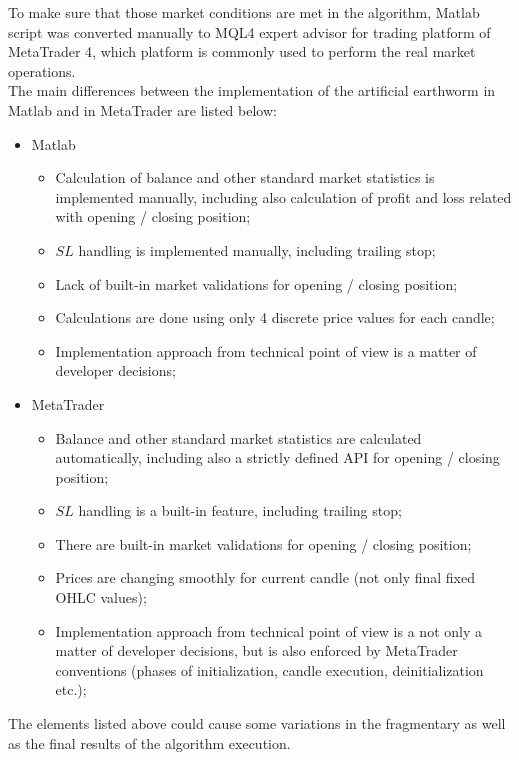\documentclass[runningheads,a4paper]{llncs}
\begin{document}
To make sure that those market conditions are met in the algorithm, Matlab script was converted manually to MQL4 expert advisor for trading platform of MetaTrader 4, which platform is commonly used to perform the real market operations.\\

The main differences between the implementation of the artificial earthworm in Matlab and in MetaTrader are listed below:
\begin{itemize}
\item Matlab
\begin{itemize}
\item Calculation of balance and other standard market statistics is implemented manually, including also calculation of profit and loss related with opening / closing position;
\item $SL$ handling is implemented manually, including trailing stop;
\item Lack of built-in market validations for opening / closing position;
\item Calculations are done using only 4 discrete price values for each candle;
\item Implementation approach from technical point of view is a matter of developer decisions;
\end{itemize}
\item MetaTrader
\begin{itemize}
\item Balance and other standard market statistics are calculated automatically, including also a strictly defined API for opening / closing position;
\item $SL$ handling is a built-in feature, including trailing stop;
\item There are built-in market validations for opening / closing position;
\item Prices are changing smoothly for current candle (not only final fixed OHLC values);
\item Implementation approach from technical point of view is a not only a matter of developer decisions, but is also enforced by MetaTrader conventions (phases of initialization, candle execution, deinitialization etc.);
\end{itemize}
\end{itemize}

The elements listed above could cause some variations in the fragmentary as well as the final results of the algorithm execution.\\
\end{document}
